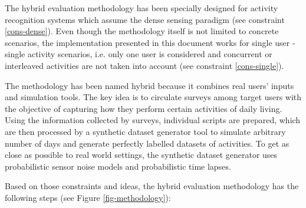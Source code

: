 \begin{comment}
 - Describe target scenario: dense sensing, single user - single activity
 - Explain in detail the steps: survey, script writing, sensor modelling, synthetic dataset generator 
\end{comment}

The hybrid evaluation methodology has been specially designed for activity recognition systems which assume the dense sensing paradigm (see constraint \ref{cons-dense}). Even though the methodology itself is not limited to concrete scenarios, the implementation presented in this document works for single user - single activity scenarios, i.e. only one user is considered and concurrent or interleaved activities are not taken into account (see constraint \ref{cons-single}). 

The methodology has been named hybrid because it combines real users’ inputs and simulation tools. The key idea is to circulate surveys among target users with the objective of capturing how they perform certain activities of daily living. Using the information collected by surveys, individual scripts are prepared, which are then processed by a synthetic dataset generator tool to simulate arbitrary number of days and generate perfectly labelled datasets of activities. To get as close as possible to real world settings, the synthetic dataset generator uses probabilistic sensor noise models and probabilistic time lapses.

Based on those constraints and ideas, the hybrid evaluation methodology has the following steps (see Figure \ref{fig-methodology}):

